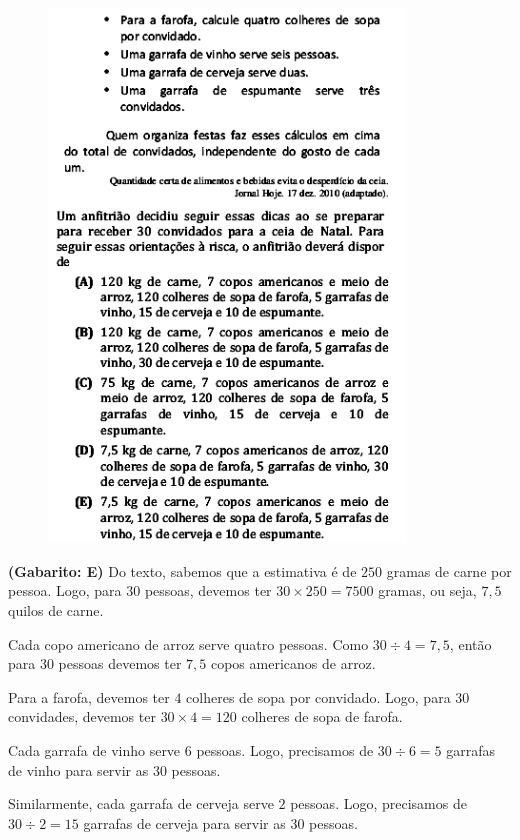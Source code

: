 \documentclass[a4paper]{article}
\begin{document}
\begin{figure}[H]
	\begin{center}
		\includegraphics[width=9.5cm]{L2Q9_2.png}
	\end{center}
\end{figure}
\par\textbf{(Gabarito: E)} Do texto, sabemos que a estimativa é de $250$ gramas de carne por pessoa. Logo, para $30$ pessoas, devemos ter $30\times 250 = 7500$ gramas, ou seja, $7,5$ quilos de carne. 
\par\vspace{0.3cm} Cada copo americano de arroz serve quatro pessoas. Como $30\div4 = 7,5$, então para $30$ pessoas devemos ter $7,5$ copos americanos de arroz.
\par\vspace{0.3cm} Para a farofa, devemos ter $4$ colheres de sopa por convidado. Logo, para $30$ convidades, devemos ter $30\times4 = 120$ colheres de sopa de farofa.
\par\vspace{0.3cm} Cada garrafa de vinho serve $6$ pessoas. Logo, precisamos de $30\div6 = 5$ garrafas de vinho para servir as $30$ pessoas.
\par\vspace{0.3cm} Similarmente, cada garrafa de cerveja serve $2$ pessoas. Logo, precisamos de $30\div2 = 15$ garrafas de cerveja para servir as $30$ pessoas.
\end{document}
